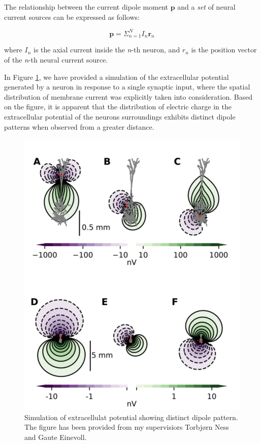 \documentclass[a4paper, UKenglish, 11pt]{uiomaster}
\begin{document}
The relationship between the current dipole moment $\textbf{p}$ and a \emph{set} of neural current sources can be expressed as follows:

\begin{equation}
\textbf{p} = \Sigma^N_{n=1}I_n\textbf{r}_n
\label{eq:extracellular_potential_approximation}
\end{equation}

where $I_n$ is the axial current inside the \emph{n}-th neuron, and $r_n$ is the position vector of the \emph{n}-th neural current source.

In Figure \ref{fig:dipole_pattern}, we have provided a simulation of the extracellular potential generated by a neuron in response to a single synaptic input, where the spatial distribution of membrane current was explicitly taken into consideration. Based on the figure, it is apparent that the distribution of electric charge in the extracellular potential of the neurons surroundings exhibits distinct dipole patterns when observed from a greater distance.

\begin{figure}
    \centering
    \includegraphics[width=\linewidth]{figures/dipole_pattern.png}
    \caption{Simulation of extracellulat potential showing distinct dipole pattern. The figure has been provided from my supervisiors Torbjørn Ness and Gaute Einevoll.}
    \label{fig:dipole_pattern}
\end{figure}
\end{document}
